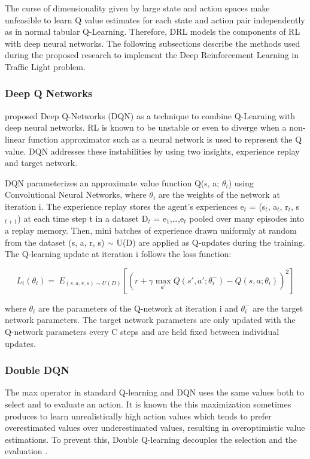 \documentclass{llncs}
\begin{document}
The curse of dimensionality given by large state and action spaces make unfeasible to learn Q value estimates for each state and action pair independently as in normal tabular Q-Learning. Therefore, DRL models the components of RL with deep neural networks. The following subsections describe the methods used during the proposed research to implement the Deep Reinforcement Learning in Traffic Light problem.

\subsubsection{Deep Q Networks}

\cite{Mnih2015} proposed Deep Q-Networks (DQN) as a technique to combine Q-Learning with deep neural networks. RL is known to be unstable or even to diverge when a non-linear function approximator such as a neural network is used to represent the Q value. DQN addresses these instabilities by using two insights, experience replay and target network.
	
	DQN parameterizes an approximate value function Q(s, a; $\theta_{i}$) using Convolutional Neural Networks, where $\theta_{i}$ are the weights of the network at iteration i. The experience replay stores the agent's experiences e$_{t}$ = (s$_{t}$, a$_{t}$, r$_{t}$, s$_{t+1}$) at each time step t in a dataset D$_{t}$ = {e$_{1}$,…,e$_{t}$} pooled over many episodes into a replay memory. Then, mini batches of experience drawn uniformly at random from the dataset (s, a, r, s) $\sim$ U(D) are applied as Q-updates during the training. The Q-learning update at iteration i follows the loss function:
	
\begin{equation}
L_{i}(\theta_{i}) = \ E_{(s,a,r,s) \sim U(D)} \left[ \left(r + \gamma \max_{a'}Q\left(s',a';\theta_{i}^{-}\right) - Q\left(s,a;\theta_{i}\right)\right)^{2} \right]
\end{equation}

where $\theta_{i}$ are the parameters of the Q-network at iteration i and $\theta_{i}^{-}$ are the target network parameters. The target network parameters are only updated with the Q-network parameters every C steps and are held fixed between individual updates.

\subsubsection{Double DQN}

	The max operator in standard Q-learning and DQN uses the same values both to select and to evaluate an action. It is known the this maximization sometimes produces to learn unrealistically high action values which tends to prefer overestimated values over underestimated values, resulting in overoptimistic value estimations. To prevent this, Double Q-learning decouples the selection and the evaluation \cite{Hasselt2010}.
	
\end{document}
